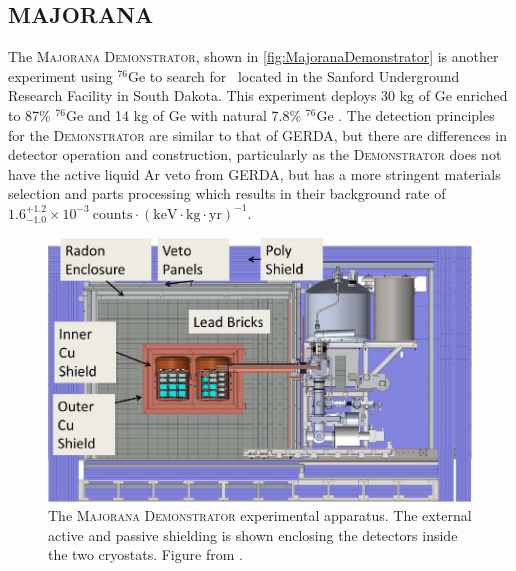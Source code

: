 \subsection{MAJORANA}
The \textsc{Majorana Demonstrator}, shown in \autoref{fig:MajoranaDemonstrator} is another experiment using $^{76}$Ge to search for \zeronubb~located in the Sanford Underground Research Facility in South Dakota.
This experiment deploys 30 kg of Ge enriched to 87\% $^{76}$Ge and 14 kg of Ge with natural 7.8\% $^{76}$Ge \cite{1742-6596-606-1-012004}.
The detection principles for the \textsc{Demonstrator} are similar to that of GERDA, but there are differences in detector operation and construction, particularly as the \textsc{Demonstrator} does not have the active liquid Ar veto from GERDA, but has a more stringent materials selection and parts processing which results in their background rate of $1.6^{+1.2}_{-1.0}\times10^{-3} ~\textrm{counts}\cdot(\textrm{keV}\cdot \textrm{kg} \cdot \textrm{yr})^{-1}$.
\begin{figure}
    \centering
    \includegraphics[width=0.8\linewidth]{Figures/MajoranaDemonstrator.png}
    \caption[The \textsc{Majorana Demonstrator} experimental apparatus]
    {The \textsc{Majorana Demonstrator} experimental apparatus.
    The external active and passive shielding is shown enclosing the detectors inside the two cryostats.
    Figure from \cite{1742-6596-606-1-012004}.}
    \label{fig:MajoranaDemonstrator}
\end{figure}
